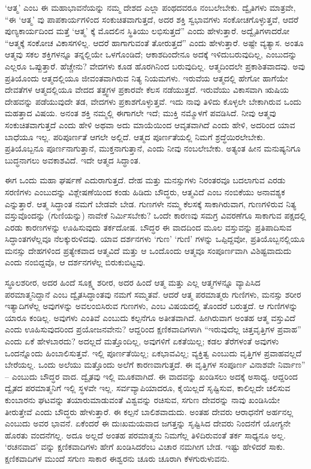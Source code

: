 ‘ಆತ್ಮ’ ಎಂಬ ಈ ಮಹಾಭಾವನೆಯನ್ನು ನಮ್ಮ ದೇಶದ ಎಲ್ಲಾ ಪಂಥದವರೂ ನಂಬಲೇಬೇಕು. ದ್ವೈತಿಗಳು ಮಾತ್ರವೇ, “ಈ ‘ಆತ್ಮ’ ವು ಪಾಪಕಾರ್ಯಗಳಿಂದ ಸಂಕುಚಿತವಾಗುತ್ತದೆ, ಅದರ ಶಕ್ತಿ ಸ್ವಭಾವಗಳು ಸಂಕೋಚಗೊಳ್ಳುತ್ತವೆ, ಆದರೆ ಪುಣ್ಯಕಾರ್ಯದಿಂದ ಮತ್ತೆ ‘ಆತ್ಮ’ ಕ್ಕೆ ಮೊದಲಿನ ಸ್ಥಿತಿಯು ಲಭಿಸುತ್ತದೆ” ಎಂದು ಹೇಳುತ್ತಾರೆ. ಅದ್ವೈತಿಗಳಾದರೋ “ಆತ್ಮಕ್ಕೆ ಸಂಕೋಚ ವಿಕಾಸಗಳಿಲ್ಲ. ಆದರೆ ಹಾಗಾಗುವಂತೆ ತೋರುತ್ತದೆ” ಎಂದು ಹೇಳುತ್ತಾರೆ. ಅಷ್ಟೇ ವ್ಯತ್ಯಾಸ. ಅಂತೂ ಆತ್ಮವು ಸಕಲ ಶಕ್ತಿಗಳನ್ನೂ ತನ್ನಲ್ಲಿಯೇ ಒಳಗೊಂಡಿದೆ; ಆಕಾಶದಿಂದೇನೂ ಅದಕ್ಕೆ ಇಳಿದುಬರುವುದಿಲ್ಲ, ಎಂಬುದನ್ನು ಎಲ್ಲರೂ ಒಪ್ಪುತ್ತಾರೆ. ಹೆಚ್ಚೇನು? ವೇದಗಳು ಕೂಡ ಹೊರಗಿನಿಂದ ಬರುವುದಿಲ್ಲ. ಆತ್ಮದಿಂದಲೇ ಪ್ರಕಾಶಿತವಾದವು. ಅವು ಪ್ರತಿಯೊಂದು ಆತ್ಮದಲ್ಲಿಯೂ ಜೀವಂತವಾಗಿರುವ ನಿತ್ಯ ನಿಯಮಗಳು. ಇರುವೆಯ ಆತ್ಮದಲ್ಲಿ ಹೇಗೋ ಹಾಗೆಯೇ ದೇವತೆಗಳ ಆತ್ಮದಲ್ಲಿಯೂ ವೇದದ ತತ್ತ್ವಗಳ ಪ್ರಕಾರವೇ ಕೆಲಸ ನಡೆಯುತ್ತದೆ. ಇರುವೆಯು ವಿಕಾಸವಾಗಿ ಋಷಿಯ ದೇಹವನ್ನು ಪಡೆಯುವುದೇ ತಡ, ವೇದಗಳು ಪ್ರಕಾಶಗೊಳ್ಳುತ್ತವೆ. ಇದು ನಾವು ತಿಳಿದು ಕೊಳ್ಳಲೇ ಬೇಕಾಗಿರುವ ಒಂದು ಮಹತ್ತಾದ ವಿಷಯ. ಅನಂತ ಶಕ್ತಿ ನಮ್ಮಲ್ಲಿ ಈಗಾಗಲೇ ಇದೆ; ಮುಕ್ತಿ ನಮ್ಮೊಳಗೆ ಪವಡಿಸಿದೆ. ನೀವು ಆತ್ಮವು ಸಂಕುಚಿತವಾಗುತ್ತದೆ ಎಂದು ಹೇಳಿ ಅಥವಾ ಅದು ಮಾಯೆಯಿಂದ ಆವೃತವಾಗಿದೆ ಎಂದು ಹೇಳಿ, ಅದರಿಂದ ಯಾವ ಬಾಧೆಯೂ ಇಲ್ಲ. ಪರಿಪೂರ್ಣತೆ ಆಗಲೇ ಅಲ್ಲಿದೆ. ಆತ್ಮದ ಪೂರ್ಣತೆಯಲ್ಲಿ ನಿಮಗೆ ಶ್ರದ್ಧೆಯಿರಲೇಬೇಕು. ಪ್ರತಿಯೊಬ್ಬನೂ ಪೂರ್ಣನಾಗುತ್ತಾನೆ, ಮುಕ್ತನಾಗುತ್ತಾನೆ, ಎಂದು ನೀವು ನಂಬಲೇಬೇಕು. ಅತ್ಯಂತ ಹೀನ ಮನುಷ್ಯನಿಗೂ ಬುದ್ಧನಾಗಲು ಅವಕಾಶವಿದೆ. ಇದೇ ಆತ್ಮದ ಸಿದ್ಧಾಂತ.

ಈಗ ಒಂದು ಮಹಾ ಘರ್ಷಣೆ ಎದುರಾಗುತ್ತದೆ. ದೇಹ ಮತ್ತು ಮನಸ್ಸುಗಳು ನಿರಂತರವೂ ಬದಲಾಗುವ ಎರಡು ಸರಣಿಗಳು ಎಂಬುದನ್ನು ವಿಶ್ಲೇಷಣೆಯಿಂದ ಕಂಡು ಹಿಡಿದು ಬೌದ್ಧರು, ಆತ್ಮವಿದೆ ಎಂಬ ನಂಬಿಕೆಯು ಅನಾವಶ್ಯಕ ಎನ್ನುತ್ತಾರೆ. ಆತ್ಮ ಸಿದ್ಧಾಂತ ನಮಗೆ ಬೇಡವೇ ಬೇಡ. ಗುಣಗಳೇ ನಮ್ಮ ಕೆಲಸಕ್ಕೆ ಸಾಕಾಗಿರುವಾಗ, ಗುಣಗಳಿರುವ ನಿತ್ಯ ವಸ್ತುವೊಂದನ್ನು (ಗುಣಿಯನ್ನು) ನಾವೇಕೆ ನಿರ್ಮಿಸಬೇಕು? ಒಂದೇ ಕಾರಣವು ಸಮಗ್ರ ವಿವರಣೆಗೂ ಸಾಕಾಗುವ ಪಕ್ಷದಲ್ಲಿ ಎರಡು ಕಾರಣಗಳನ್ನು ಊಹಿಸುವುದು ತರ್ಕದೋಷ. ಬೌದ್ಧರ ಈ ವಾದದಿಂದ ಮೂಲ ವಸ್ತುವನ್ನು ಪ್ರತಿಪಾದಿಸುವ ಸಿದ್ಧಾಂತಗಳೆಲ್ಲವೂ ನೆಲಕ್ಕುರುಳಿದವು. ಯಾವ ದರ್ಶನಗಳು ‘ಗುಣ’ ‘ಗುಣಿ’ ಗಳನ್ನು ಒಪ್ಪಿದ್ದವೋ, ಪ್ರತಿಯೊಬ್ಬನಲ್ಲಿಯೂ ಮನಸ್ಸು ದೇಹಗಳಿಂದ ಪ್ರತ್ಯೇಕವಾದ ಆತ್ಮವಿದೆ ಮತ್ತು ಆ ಒಂದೊಂದು ಆತ್ಮವೂ ಸಂಪೂರ್ಣವಾಗಿ ವಿಶಿಷ್ಟವಾದುದು ಎಂದು ನಂಬಿದ್ದವೊ, ಆ ದರ್ಶನಗಳೆಲ್ಲ ಬಿರುಕುಬಿಟ್ಟವು.

ಸ್ಥೂಲಶರೀರ, ಅದರ ಹಿಂದೆ ಸೂಕ್ಷ್ಮ ಶರೀರ, ಅದರ ಹಿಂದೆ ಆತ್ಮ ಮತ್ತು ಎಲ್ಲ ಆತ್ಮಗಳನ್ನೂ ವ್ಯಾಪಿಸಿದ ಪರಮಾತ್ಮನಿದ್ದಾನೆ ಎಂಬ ದ್ವೈತಸಿದ್ಧಾಂತವು ನಮಗೆ ಸಮ್ಮತವೆ. ಆದರೆ ಆತ್ಮ ಪರಮಾತ್ಮರು ಗುಣಿಗಳು, ಮನಸ್ಸು ಶರೀರ ಇತ್ಯಾದಿಗಳೆಲ್ಲ ಅವುಗಳನ್ನು ಅವಲಂಬಿಸಿರುವ ಗುಣಗಳು, ಎಂಬ ವಿಷಯದಲ್ಲಿ ತೊಂದರೆ ಬರುತ್ತದೆ. ಆ ಗುಣಿಗಳನ್ನು ಯಾರೂ ಕಂಡಿಲ್ಲ. ಅವುಗಳು ಎಂತಿವೆ ಎಂಬುದು ಕಲ್ಪನೆಗೂ ಅತೀತವಾಗಿದೆ. ಹೀಗಿರುವಾಗ ಅಂತಹ ಆತ್ಮ ವಸ್ತುವಿದೆ ಎಂದು ಊಹಿಸುವುದರಿಂದ ಪ್ರಯೋಜನವೇನು? ಆದ್ದರಿಂದ ಕ್ಷಣಿಕವಾದಿಗಳಾಗಿ “ಇರುವುದೆಲ್ಲ ಚಿತ್ತವೃತ್ತಿಗಳ ಪ್ರವಾಹ” ಎಂದು ಏಕೆ ಹೇಳಬಾರದು? ಅದಲ್ಲದೆ ಮತ್ತೊಂದಿಲ್ಲ, ಅವುಗಳಿಗೆ ಏಕತೆಯಿಲ್ಲ; ಕಡಲ ತೆರೆಗಳಂತೆ ಅವುಗಳು ಒಂದನ್ನೊಂದು ಹಿಂಬಾಲಿಸುತ್ತವೆ. ಇಲ್ಲಿ ಪೂರ್ಣತೆಯಿಲ್ಲ; ಏಕಭಾವವಿಲ್ಲ; ವ್ಯಕ್ತಿತ್ವ ಎಂಬುದು ವೃತ್ತಿಗಳ ಪ್ರವಾಹವಲ್ಲದೆ ಬೇರೆಯಲ್ಲ. ಒಂದು ಅಲೆಯು ಮತ್ತೊಂದು ಅಲೆಗೆ ಕಾರಣವಾಗುತ್ತದೆ. ಈ ವೃತ್ತಿಗಳ ಸಂಪೂರ್ಣ ವಿನಾಶವೇ ನಿರ್ವಾಣ” – ಎಂಬುದು ಬೌದ್ಧರ ವಾದ. ದ್ವೈತವು ಇಲ್ಲಿ ಮೂಕವಾಗಿದೆ. ಈ ವಾದವನ್ನು ಖಂಡಿಸಲು ಅದಕ್ಕೆ ಅಸಾಧ್ಯ. ಆದ್ದರಿಂದ ದ್ವೈತದ ಪರಮಾತ್ಮನಿಗೆ ಇಲ್ಲಿ ಸ್ಥಳವೇ ಇಲ್ಲ. ಸರ್ವವ್ಯಾಪಿಯಾದರೂ, ಕೈಯಿಲ್ಲದೆ ಸೃಷ್ಟಿಸುವ, ಕಾಲಿಲ್ಲದೇ ಚಲಿಸುವ ಕುಂಬಾರನು ಘಟವನ್ನು ತಯಾರುಮಾಡುವಂತೆ ವಿಶ್ವವನ್ನು ರಚಿಸುವ, ಸಗುಣ ದೇವರನ್ನು ನಾವು ಖಂಡಿಸಿಯೇ ತೀರುತ್ತೇವೆ ಎಂದು ಬೌದ್ಧರು ಹೇಳುತ್ತಾರೆ. ಈ ಕಲ್ಪನೆ ಬಾಲಿಶವಾದುದು. ಅಂತಹ ದೇವರು ಆರಾಧನೆಗೆ ಅರ್ಹನಲ್ಲ ಎಂಬುದು ಅವರ ಭಾವನೆ. ಏಕೆಂದರೆ ಈ ದುಃಖಮಯವಾದ ಜಗತ್ತನ್ನು ಸೃಷ್ಟಿಸಿದ ದೇವರು ನಿಂದನೆಗೆ ಯೋಗ್ಯನೇ ಹೊರತು ವಂದನೆಗಲ್ಲ. ಅದೂ ಅಲ್ಲದೆ ಅಂತಹ ಪರಮಾತ್ಮನು ನಿಮಗೆಲ್ಲ ತಿಳಿದಿರುವಂತೆ ತರ್ಕ ಸಾಧ್ಯನೂ ಅಲ್ಲ. ‘ರಚನವಾದ’  ವನ್ನು ಕ್ಷಣಿಕವಾದಿಗಳು ಹೇಗೆ ಖಂಡಿಸಿದರೆಂಬ ವಿಚಾರ ನಮಗೀಗ ಬೇಡ. ಇಷ್ಟು ಹೇಳಿದರೆ ಸಾಕು. ಕ್ಷಣಿಕವಾದಿಗಳ ಮುಂದೆ ಸಗುಣ ಸಾಕಾರ ಈಶ್ವರನು ಚೂರು ಚೂರಾಗಿ ಕೆಳಗುರುಳುವನು.

